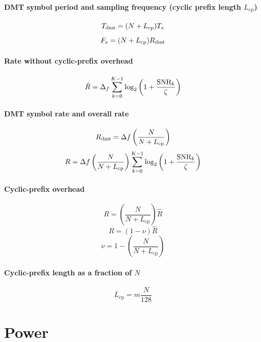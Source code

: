 \paragraph{DMT symbol period and sampling frequency (cyclic prefix length $L_{\textrm{cp}}$)}
\[
{T_{\textrm{dmt}}} = (N + L_{\textrm{cp}}) {T_s}
\]
\begin{equation}
{F_s} = (N+L_{\textrm{cp}}) {R_{\textrm{dmt}}}
\label{eq:dmt_fs_rdmt}
\end{equation}

\paragraph{Rate without cyclic-prefix overhead}
\begin{equation}
\hat R = \Delta_f \sum_{k=0}^{K-1} \log_2 \left(1 + \frac{{\textrm{SNR}}_k}{\zeta}\right)
\label{eq:rate2}
\end{equation}

\paragraph{DMT symbol rate and overall rate}
\begin{equation}
 {R_{\textrm{dmt}}} = \Delta f \left(\frac {N} {N+L_{\textrm{cp}}} \right)
\label{eq:dmt_delta_f_rdmt}
\end{equation}
\begin{equation}
R = \Delta f \left(\frac {N} {N+L_{\textrm{cp}}} \right) \sum_{k=0}^{K-1} \log_2 \left(1 + \frac{{\textrm{SNR}}_k}{\zeta}\right)
\label{eq:rate3}
\end{equation}

\paragraph{Cyclic-prefix overhead}
\[
R = \left(\frac {N} {N+L_{\textrm{cp}}} \right) \hat R
\]
\begin{equation}
R = (1 - \nu) \hat R
\label{eq:overhead}
\end{equation}
\[
\nu = 1 - \left(\frac {N} {N+L_{\textrm{cp}}} \right)
\]

\paragraph{Cyclic-prefix length as a fraction of $N$}
\[
L_{\textrm{cp}}=m \frac{N}{128}
\]

\section*{Power}

